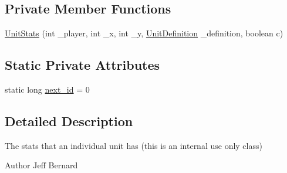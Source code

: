 \subsection*{Private Member Functions}
\begin{DoxyCompactItemize}
\item 
\hyperlink{classrts_1_1units_1_1_unit_stats_aa1eba689a26fb4740cc7e476c8eccb0e}{UnitStats} (int \_\-player, int \_\-x, int \_\-y, \hyperlink{classrts_1_1units_1_1_unit_definition}{UnitDefinition} \_\-definition, boolean c)
\end{DoxyCompactItemize}
\subsection*{Static Private Attributes}
\begin{DoxyCompactItemize}
\item 
static long \hyperlink{classrts_1_1units_1_1_unit_stats_a80ab0040be7e369e4572ed223942cd57}{next\_\-id} = 0
\end{DoxyCompactItemize}


\subsection{Detailed Description}
The stats that an individual unit has (this is an internal use only class) 

\begin{DoxyAuthor}{Author}
Jeff Bernard 
\end{DoxyAuthor}


